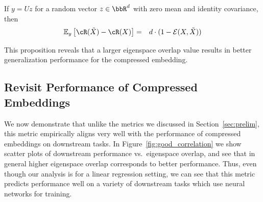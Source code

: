\begin{proposition}
If $y = Uz$ for a random vector $z \in \RR^d$ with zero mean and identity covariance, then
\begin{eqnarray}
\expect{y}{\cR(\tX) - \cR(X)} &=& d\cdot(1 - \eigover(X,\tX))
\end{eqnarray}
\end{proposition}

This proposition reveals that a larger eigenspace overlap value results in better generalization performance for the compressed embedding.



\subsection{Revisit Performance of Compressed Embeddings}
\label{subsec:revisit}
We now demonstrate that unlike the metrics we discussed in Section~\ref{sec:prelim}, this metric empirically aligns very well with the performance of compressed embeddings on downstream tasks.
In Figure~\ref{fig:good_correlation} we show scatter plots of downstream performance vs.\ eigenspace overlap, and see that in general higher eigenspace overlap corresponds to better performance.
Thus, even though our analysis is for a linear regression setting, we can see that this metric predicts performance well on a variety of downstream tasks which use neural networks for training.



